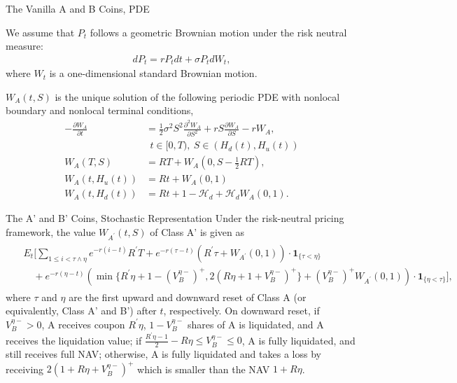 \documentclass[notes=show, beamer, handout]{beamer}
\begin{document}
\begin{frame}{The Vanilla A and B Coins, PDE}

We assume that $P_t$ follows a geometric Brownian motion under the risk neutral measure:
\begin{align*}
dP_{t}=r P_tdt+\sigma P_{t}dW_{t},
\end{align*}
where $W_{t}$ is a one-dimensional standard Brownian motion.




$W_{A}(t,S)$ is the unique solution of the following periodic PDE with nonlocal boundary and nonlocal terminal conditions, 
\begin{align*}
-\frac{\partial W_{A}}{\partial t} & =\frac{1}{2}\sigma^{2}S^{2}\frac{\partial^{2}W_{A}}{\partial S^{2}}+r S\frac{\partial W_{A}}{\partial S}-r W_{A}, \\
&   ~~t\in[0,T),~S\in (H_d(t),H_u(t))\\
W_{A}(T,S) & =RT+W_{A}(0,S-\frac{1}{2}RT),\\
W_{A}(t,H_{u}(t)) & =Rt+W_{A}(0,1)\\
W_{A}(t,H_d(t)) & =Rt+1-\mathcal{H}_{d}+\mathcal{H}_{d}W_{A}(0,1).
\end{align*}



\end{frame}

\begin{frame}{The  A' and B' Coins, Stochastic Representation}
\small
Under the risk-neutral pricing framework, the value $W_{A^\prime}(t,S)$ of Class A' is given as
{\scriptsize\begin{align*}
\begin{split} ~& E_{t}\Bigg[\sum_{1\le i<\tau\land\eta}e^{-r(i-t)}R^\prime T+e^{-r(\tau-t)}(R^\prime\tau+W_{A^\prime}(0,1))\cdot\mathbf{1}_{\{\tau<\eta\}}\\
 & \quad+e^{-r(\eta-t)}\left(\min\{R^\prime\eta+1-(V_{B}^{\eta-})^+,2(R\eta+1+V_B^{\eta-})^+\}+(V_{B}^{\eta-})^+W_{A^\prime}(0,1)\right)\cdot\mathbf{1}_{\{\eta<\tau\}}\Bigg],
\end{split}
\end{align*}}
where $\tau$ and $\eta$ are the first upward and downward reset of Class A (or equivalently, Class A' and B') after $t$, respectively. On downward reset, if $V_B^{\eta-}>0$, A receives coupon $R^\prime\eta$, $1-V_B^{\eta-}$ shares of A is liquidated, and A receives the liquidation value; if $\frac{R^\prime\eta-1}{2}-R\eta\le V_B^{\eta-}\le 0$, A is fully liquidated, and still receives full NAV; otherwise, A is fully liquidated and takes a loss by receiving $2(1+R\eta+V_B^{\eta-})^+$ which is smaller than the NAV $1+R\eta$.
\end{frame}
\end{document}
